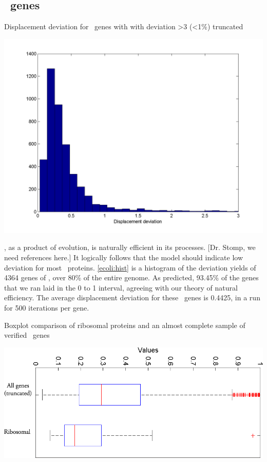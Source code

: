 \documentclass[12pt]{article}
\numberwithin{equation}{section}
\begin{document}
\subsection{\ecoli\ genes}
\begin{cfigure}
  \caption{Displacement deviation for \ecoli\ genes with with
    deviation >3 (<1\%) truncated}
  \label{ecoli:hist}
  \includegraphics[scale=0.4]{histograms/everything}
\end{cfigure}

\ecoli, as a product of evolution, is naturally efficient in its
processes. [Dr. Stomp, we need references here.]  It logically follows
that the model should indicate low deviation for most
\ecoli\ proteins.  \autoref{ecoli:hist} is a histogram of the
deviation yields of 4364 genes of \ecoli, over 80\% of the entire
genome.  As predicted, 93.45\% of the genes that we ran laid in the 0
to 1 interval, agreeing with our theory of natural efficiency.  The
average displacement deviation for these \ecoli\ genes is 0.4425, in a
run for 500 iterations per gene.

\begin{cfigure}
  \caption{Boxplot comparison of ribosomal proteins and an almost
    complete sample of verified \ecoli\ genes}
  \label{ribosomal:comp}
  \includegraphics[width=\textwidth]{histograms/ribosomal}
\end{cfigure}
\end{document}

